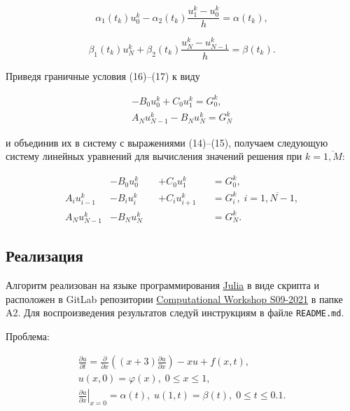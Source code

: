 \su\su
\begin{equation}
  \alpha_1(t_k) u_0^k - \alpha_2(t_k) \frac{u_1^k - u_0^k}{h} = \alpha(t_k),
\end{equation}

\su
\begin{equation}
  \beta_1(t_k) u_N^k + \beta_2(t_k) \frac{u_N^k - u_{N-1}^k}{h} = \beta(t_k).
\end{equation}

Приведя граничные условия (16)--(17) к виду

\su
\begin{equation}
\begin{gathered}
  - B_0 u_0^k + C_0 u_1^k = G_0^k, \\
  A_N u_{N-1}^k - B_N u_N^k = G_N^k
\end{gathered}
\end{equation}

и объединив их в систему с выражениями (14)--(15), получаем следующую систему линейных уравнений для вычисления значений решения при $ k = \overline{1, M} $:

\begin{equation}
\begin{alignedat}{4}
  & -B_0 u_0^k && + C_0 u_1^k && = G_0^k, \\
  A_i u_{i-1}^k & - B_i u_i^k && + C_i u_{i+1}^k && = G_i^k, \; i = \overline{1, N-1}, \\
  A_N u_{N-1}^k & - B_N u_N^k && && = G_N^k.
\end{alignedat}
\end{equation}

\subsection*{Реализация}

Алгоритм реализован на языке программирования \href{https://julialang.org/}{Julia} в виде скрипта и расположен в GitLab репозитории \href{https://gitlab.com/paveloom-g/university/s09-2021/computational-workshop}{Computational Workshop S09-2021} в папке A2. Для воспроизведения результатов следуй инструкциям в файле {\footnotesize \texttt{README.md}}. \npar

\newpage

Проблема:

\begin{equation}
\begin{gathered}
  \frac{\partial u}{\partial t} = \frac{\partial}{\partial x} \left( (x + 3) \frac{\partial u}{\partial x} \right) - xu + f(x, t), \\
  u(x, 0) = \varphi(x), \; 0 \leqslant x \leqslant 1, \\
  \left. \frac{\partial u}{\partial x} \right|_{x=0} = \alpha(t), \; u(1, t) = \beta(t), \; 0 \leqslant t \leqslant 0.1.
\end{gathered}
\end{equation}

